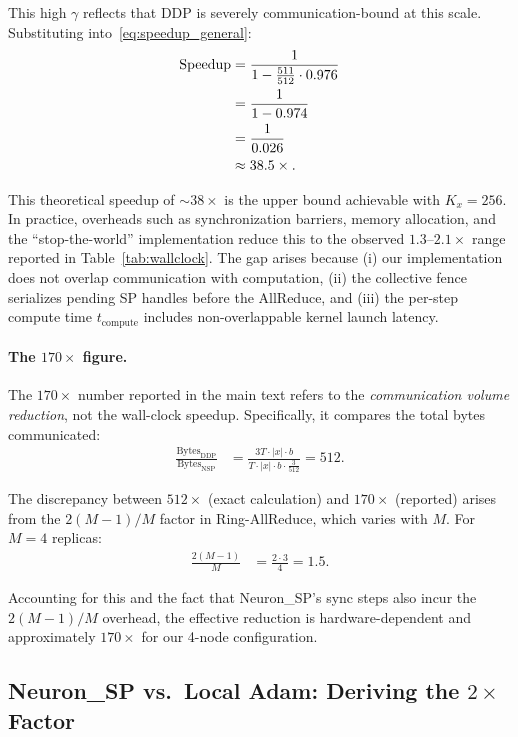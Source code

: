 \documentclass{article}
\begin{document}
This high $\gamma$ reflects that DDP is severely communication-bound at
this scale. Substituting into~\eqref{eq:speedup_general}:
\begin{align}
\text{Speedup}
&= \frac{1}{1 - \frac{511}{512} \cdot 0.976}
\notag \\
&= \frac{1}{1 - 0.974}
\notag \\
&= \frac{1}{0.026}
\notag \\
&\approx 38.5\times.
\label{eq:speedup_concrete}
\end{align}

This theoretical speedup of $\sim 38\times$ is the upper bound achievable
with $K_x = 256$. In practice, overheads such as synchronization barriers,
memory allocation, and the ``stop-the-world'' implementation reduce this
to the observed $1.3$--$2.1\times$ range reported in Table~\ref{tab:wallclock}.
The gap arises because (i) our implementation does not overlap
communication with computation, (ii) the collective fence serializes
pending SP handles before the AllReduce, and (iii) the per-step compute
time $t_{\text{compute}}$ includes non-overlappable kernel launch latency.

\paragraph{The $170\times$ figure.}
The $170\times$ number reported in the main text refers to the
\emph{communication volume reduction}, not the wall-clock speedup.
Specifically, it compares the total bytes communicated:
\begin{align}
\frac{\text{Bytes}_{\text{DDP}}}{\text{Bytes}_{\text{NSP}}}
&= \frac{3T \cdot |x| \cdot b}
{T \cdot |x| \cdot b \cdot \frac{3}{512}}
= 512.
\label{eq:bytes_ratio}
\end{align}

The discrepancy between $512\times$ (exact calculation) and $170\times$
(reported) arises from the $2(M-1)/M$ factor in Ring-AllReduce, which
varies with $M$. For $M = 4$ replicas:
\begin{align}
\frac{2(M-1)}{M} &= \frac{2 \cdot 3}{4} = 1.5.
\label{eq:ring_factor}
\end{align}

Accounting for this and the fact that Neuron\_SP's sync steps also incur
the $2(M-1)/M$ overhead, the effective reduction is hardware-dependent
and approximately $170\times$ for our 4-node configuration.

\subsection{Neuron\_SP vs.\ Local Adam: Deriving the $2\times$ Factor}
\end{document}
